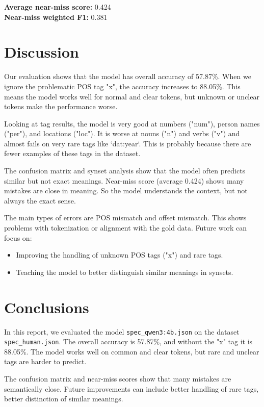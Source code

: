 \documentclass[12pt,a4paper]{article}
\begin{document}
\textbf{Average near-miss score:} 0.424\\  
\textbf{Near-miss weighted F1:} 0.381

\section{Discussion}
\label{sec:discussion}
Our evaluation shows that the model has overall accuracy of 57.87\%. When we ignore the problematic POS tag "x", the accuracy increases to 88.05\%. This means the model works well for normal and clear tokens, but unknown or unclear tokens make the performance worse.

Looking at tag results, the model is very good at numbers ("num"), person names ("per"), and locations ("loc"). It is worse at nouns ("n") and verbs ("v") and almost fails on very rare tags like `dat:year`. This is probably because there are fewer examples of these tags in the dataset.

The confusion matrix and synset analysis show that the model often predicts similar but not exact meanings. Near-miss score (average 0.424) shows many mistakes are close in meaning. So the model understands the context, but not always the exact sense.

The main types of errors are POS mismatch and offset mismatch. This shows problems with tokenization or alignment with the gold data. Future work can focus on:
\begin{itemize}
    \item Improving the handling of unknown POS tags ("x") and rare tags.
    \item Teaching the model to better distinguish similar meanings in synsets.
\end{itemize}

\section{Conclusions}
\label{sec:conclusions}
In this report, we evaluated the model \texttt{spec\_qwen3:4b.json} on the dataset \texttt{spec\_human.json}. The overall accuracy is 57.87\%, and without the "x" tag it is 88.05\%. The model works well on common and clear tokens, but rare and unclear tags are harder to predict.

The confusion matrix and near-miss scores show that many mistakes are semantically close. Future improvements can include better handling of rare tags, better distinction of similar meanings.
\end{document}
